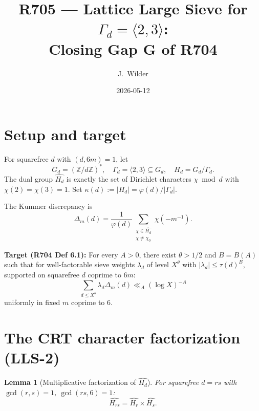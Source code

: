 \documentclass[11pt]{article}
\title{R705 --- Lattice Large Sieve for $\Gamma_d = \langle 2, 3\rangle$:\\
Closing Gap G of R704}
\author{J.\ Wilder}
\date{2026-05-12}
\newtheorem{lemma}[theorem]{Lemma}
\newcommand{\Z}{\mathbb Z}
\begin{document}
\maketitle

\begin{center}
\end{center}

\section{Setup and target}

For squarefree $d$ with $(d, 6m) = 1$, let
\[
G_d = (\Z/d\Z)^*, \quad \Gamma_d = \langle 2, 3 \rangle \subseteq G_d, \quad H_d = G_d/\Gamma_d.
\]
The dual group $\widehat{H_d}$ is exactly the set of Dirichlet characters $\chi \bmod d$ with $\chi(2) = \chi(3) = 1$. Set $\kappa(d) := |H_d| = \varphi(d)/|\Gamma_d|$.

The Kummer discrepancy is
\[
\Delta_m(d) = \frac{1}{\varphi(d)} \sum_{\substack{\chi \in \widehat{H_d} \\ \chi \neq \chi_0}} \chi(-m^{-1}).
\]

\textbf{Target (R704 Def 6.1):} For every $A > 0$, there exist $\theta > 1/2$ and $B = B(A)$ such that for well-factorable sieve weights $\lambda_d$ of level $X^\theta$ with $|\lambda_d| \leq \tau(d)^B$, supported on squarefree $d$ coprime to $6m$:
\begin{equation}\label{eq:LLS}
\sum_{d \leq X^\theta} \lambda_d \Delta_m(d) \ll_A (\log X)^{-A}
\end{equation}
uniformly in fixed $m$ coprime to 6.

\section{The CRT character factorization (LLS-2)}

\begin{lemma}[Multiplicative factorization of $\widehat{H_d}$]\label{lem:character-CRT}
For squarefree $d = rs$ with $\gcd(r, s) = 1$, $\gcd(rs, 6) = 1$:
\[
\widehat{H_{rs}} = \widehat{H_r} \times \widehat{H_s}.
\]
\end{lemma}
\end{document}

